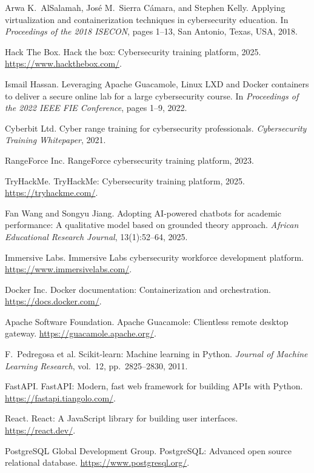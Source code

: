 \documentclass[12pt,a4paper]{report}
\begin{document}
\begin{enumerate}[label={[\arabic*]}, leftmargin=2.2em]
  \item Arwa K.\ AlSalamah, José M.\ Sierra Cámara, and Stephen Kelly. Applying virtualization and containerization techniques in cybersecurity education. In \textit{Proceedings of the 2018 ISECON}, pages 1--13, San Antonio, Texas, USA, 2018.
  \item Hack The Box. Hack the box: Cybersecurity training platform, 2025. \url{https://www.hackthebox.com/}.
  \item Ismail Hassan. Leveraging Apache Guacamole, Linux LXD and Docker containers to deliver a secure online lab for a large cybersecurity course. In \textit{Proceedings of the 2022 IEEE FIE Conference}, pages 1--9, 2022.
  \item Cyberbit Ltd. Cyber range training for cybersecurity professionals. \textit{Cybersecurity Training Whitepaper}, 2021.
  \item RangeForce Inc. RangeForce cybersecurity training platform, 2023.
  \item TryHackMe. TryHackMe: Cybersecurity training platform, 2025. \url{https://tryhackme.com/}.
  \item Fan Wang and Songyu Jiang. Adopting AI-powered chatbots for academic performance: A qualitative model based on grounded theory approach. \textit{African Educational Research Journal}, 13(1):52--64, 2025.
  \item Immersive Labs. Immersive Labs cybersecurity workforce development platform. \url{https://www.immersivelabs.com/}.
  \item Docker Inc. Docker documentation: Containerization and orchestration. \url{https://docs.docker.com/}.
  \item Apache Software Foundation. Apache Guacamole: Clientless remote desktop gateway. \url{https://guacamole.apache.org/}.
  \item F.\ Pedregosa et al. Scikit-learn: Machine learning in Python. \textit{Journal of Machine Learning Research}, vol.\ 12, pp.\ 2825--2830, 2011.
  \item FastAPI. FastAPI: Modern, fast web framework for building APIs with Python. \url{https://fastapi.tiangolo.com/}.
  \item React. React: A JavaScript library for building user interfaces. \url{https://react.dev/}.
  \item PostgreSQL Global Development Group. PostgreSQL: Advanced open source relational database. \url{https://www.postgresql.org/}.

\end{enumerate}
\end{document}
